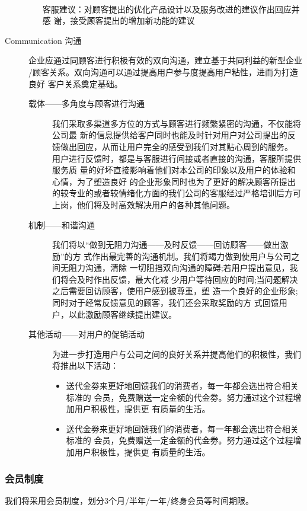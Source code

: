 \documentclass[UTF8]{ctexart}
\begin{document}
\begin{description}
\begin{enumerate}[1)]
			      \\客服建议：对顾客提出的优化产品设计以及服务改进的建议作出回应并感 谢，接受顾客提出的增加新功能的建议
		\end{enumerate}
	\item [Communication 沟通]
	      企业应通过同顾客进行积极有效的双向沟通，建立基于共同利益的新型企业 /顾客关系。双向沟通可以通过提高用户参与度提高用户粘性，进而为打造良好 客户关系奠定基础。
	      \begin{description}
		      \item[载体——多角度与顾客进行沟通]
			      我们采取多渠道多方位的方式与顾客进行频繁紧密的沟通，不仅能将公司最 新的信息提供给客户同时也能及时针对用户对公司提出的反馈做出回应，从而让用户完全的感受到我们对其贴心周到的服务。\\用户进行反馈时，都是与客服进行间接或者直接的沟通，客服所提供服务质 量的好坏直接影响着他们对本公司的印象以及用户的体验和心情，为了塑造良好 的企业形象同时也为了更好的解决顾客所提出的较专业的或者较情绪化方面的我们公司的客服经过严格培训后方可上岗，他们将及时高效解决用户的各种其他问题。
		      \item[机制——和谐沟通 ]
			      我们将以“做到无阻力沟通——及时反馈——回访顾客——做出激励”的方 式作出最完善的沟通机制。我们将竭力做到使用户与公司之间无阻力沟通，清除 一切阻挡双向沟通的障碍;若用户提出意见，我们将会及时作出反馈，最大化减 少用户等待回应的时间;当问题解决之后需要回访顾客，使用户感到被尊重，塑 造一个良好的企业形象;同时对于经常反馈意见的顾客，我们还会采取奖励的方 式回馈用户，以此激励顾客继续提出建议。
		      \item[其他活动——对用户的促销活动]
			      为进一步打造用户与公司之间的良好关系并提高他们的积极性，我们将推出以下活动：
			      \begin{itemize}
				      \item 送代金劵来更好地回馈我们的消费者，每一年都会选出符合相关标准的 会员，免费赠送一定金额的代金劵。努力通过这个过程增加用户积极性，提供更 有质量的生活。
				      \item 送代金劵来更好地回馈我们的消费者，每一年都会选出符合相关标准的 会员，免费赠送一定金额的代金劵。努力通过这个过程增加用户积极性，提供更 有质量的生活。
			      \end{itemize}
	      \end{description}
\end{description}
\subsubsection{会员制度}
我们将采用会员制度，划分3个月/半年/一年/终身会员等时间期限。
\end{document}

